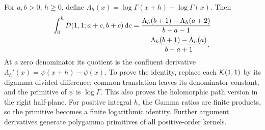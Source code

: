 For $a,b>0$, $h\ge0$, define
$\Lambda_h(x)=\log\Gamma(x+h)-\log\Gamma(x)$.
Then
\begin{equation}\label{eq:gamma-primitive}
 \begin{split}
 \int_0^h\mathcal D(1,1;a+c,b+c)\,\mathrm d c
 ={}&\frac{\Lambda_h(b+1)-\Lambda_h(a+2)}{b-a-1}\\
 &-\frac{\Lambda_h(b+1)-\Lambda_h(a)}{b-a+1}.
 \end{split}
\end{equation}
At a zero denominator its quotient is the confluent derivative
$\Lambda_h'(x)=\psi(x+h)-\psi(x)$. To prove the identity, replace
each $\mathcal K(1,1)$ by its digamma divided difference; common
translation leaves its denominator constant, and the primitive of
$\psi$ is $\log\Gamma$. This also proves the holomorphic path version
in the right half-plane. For positive integral $h$, the Gamma ratios
are finite products, so the primitive becomes a finite logarithmic
identity. Further argument derivatives generate polygamma primitives
of all positive-order kernels.
